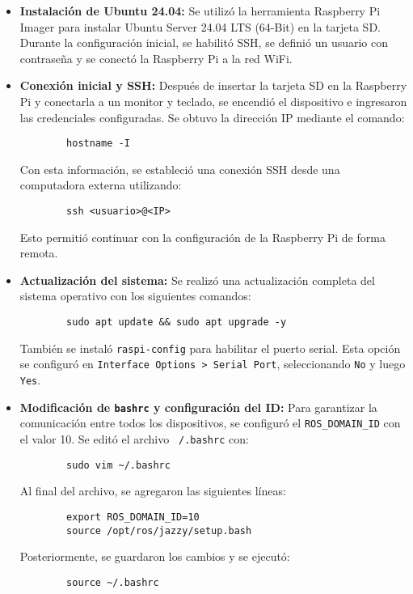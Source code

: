     \begin{itemize}
        \item \textbf{Instalación de Ubuntu 24.04:} 
        Se utilizó la herramienta Raspberry Pi Imager para instalar Ubuntu Server 24.04 LTS (64-Bit) en la tarjeta SD. Durante la configuración inicial, se habilitó SSH, se definió un usuario con contraseña y se conectó la Raspberry Pi a la red WiFi.
    
        \item \textbf{Conexión inicial y SSH:} 
        Después de insertar la tarjeta SD en la Raspberry Pi y conectarla a un monitor y teclado, se encendió el dispositivo e ingresaron las credenciales configuradas. Se obtuvo la dirección IP mediante el comando:
        \begin{verbatim}
        hostname -I
        \end{verbatim}
        Con esta información, se estableció una conexión SSH desde una computadora externa utilizando:
        \begin{verbatim}
        ssh <usuario>@<IP>
        \end{verbatim}
        Esto permitió continuar con la configuración de la Raspberry Pi de forma remota.
    
        \item \textbf{Actualización del sistema:} 
        Se realizó una actualización completa del sistema operativo con los siguientes comandos:
        \begin{verbatim}
        sudo apt update && sudo apt upgrade -y
        \end{verbatim}
        También se instaló \texttt{raspi-config} para habilitar el puerto serial. Esta opción se configuró en \texttt{Interface Options > Serial Port}, seleccionando \texttt{No} y luego \texttt{Yes}.
    
        \item \textbf{Modificación de \texttt{bashrc} y configuración del ID:} 
        Para garantizar la comunicación entre todos los dispositivos, se configuró el \texttt{ROS\_DOMAIN\_ID} con el valor 10. Se editó el archivo \texttt{~/.bashrc} con:
        \begin{verbatim}
        sudo vim ~/.bashrc
        \end{verbatim}
        Al final del archivo, se agregaron las siguientes líneas:
        \begin{verbatim}
        export ROS_DOMAIN_ID=10
        source /opt/ros/jazzy/setup.bash
        \end{verbatim}
        Posteriormente, se guardaron los cambios y se ejecutó:
        \begin{verbatim}
        source ~/.bashrc
        \end{verbatim}
    

\end{itemize}
